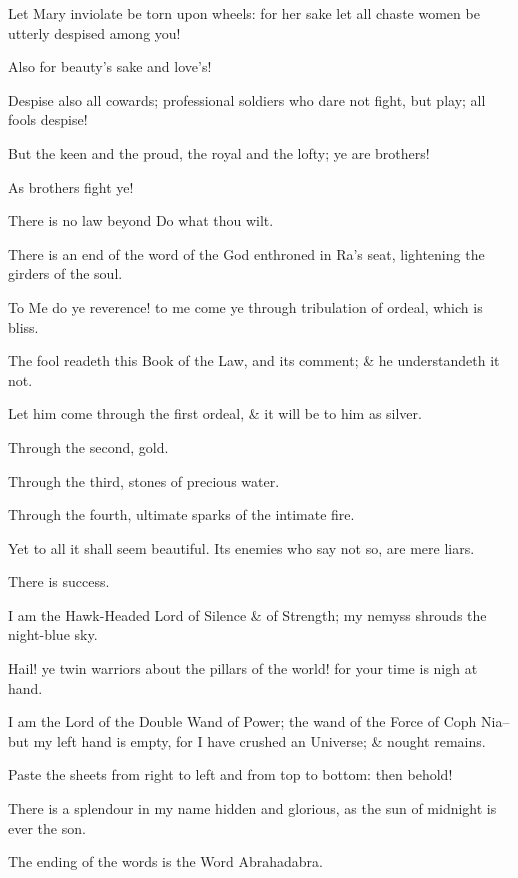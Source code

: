 Let Mary inviolate be torn upon wheels: for her sake let all chaste women be utterly despised among you!

Also for beauty's sake and love's!

Despise also all cowards; professional soldiers who dare not fight, but play; all fools despise!

But the keen and the proud, the royal and the lofty; ye are brothers!

As brothers fight ye!

There is no law beyond Do what thou wilt.

There is an end of the word of the God enthroned in Ra's seat, lightening the girders of the soul.

To Me do ye reverence! to me come ye through tribulation of ordeal, which is bliss.

The fool readeth this Book of the Law, and its comment; \& he understandeth it not.

Let him come through the first ordeal, \& it will be to him as silver.

Through the second, gold.

Through the third, stones of precious water.

Through the fourth, ultimate sparks of the intimate fire.

Yet to all it shall seem beautiful. Its enemies who say not so, are mere liars.

There is success.

I am the Hawk-Headed Lord of Silence \& of Strength; my nemyss shrouds the night-blue sky.

Hail! ye twin warriors about the pillars of the world! for your time is nigh at hand.

I am the Lord of the Double Wand of Power; the wand of the Force of Coph Nia--but my left hand is empty, for I have crushed an Universe; \& nought remains.

Paste the sheets from right to left and from top to bottom: then behold!

There is a splendour in my name hidden and glorious, as the sun of midnight is ever the son.

The ending of the words is the Word Abrahadabra.
